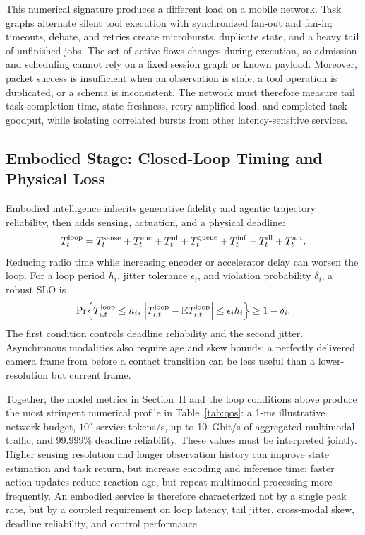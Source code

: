\documentclass[letterpaper,journal]{IEEEtran}
\begin{document}
This numerical signature produces a different load on a mobile network. Task
graphs alternate silent tool execution with synchronized fan-out and fan-in;
timeouts, debate, and retries create microbursts, duplicate state, and a heavy
tail of unfinished jobs. The set of active flows changes during execution, so
admission and scheduling cannot rely on a fixed session graph or known payload.
Moreover, packet success is insufficient when an observation is stale, a tool
operation is duplicated, or a schema is inconsistent. The network must
therefore measure tail task-completion time, state freshness, retry-amplified
load, and completed-task goodput, while isolating correlated bursts from other
latency-sensitive services.

\subsection{Embodied Stage: Closed-Loop Timing and Physical Loss}
Embodied intelligence inherits generative fidelity and agentic trajectory
reliability, then adds sensing, actuation, and a physical deadline:
\begin{equation}
T_t^{\rm loop}=T_t^{\rm sense}+T_t^{\rm enc}+T_t^{\rm ul}
+T_t^{\rm queue}+T_t^{\rm inf}+T_t^{\rm dl}+T_t^{\rm act}.
\label{eq:loop_delay}
\end{equation}
Reducing radio time while increasing encoder or accelerator delay can worsen
the loop. For a loop period $h_i$, jitter tolerance $\epsilon_i$, and violation
probability $\delta_i$, a robust SLO is
\begin{equation}
\Pr\!\left\{T_{i,t}^{\rm loop}\le h_i,\,
\left|T_{i,t}^{\rm loop}-\mathbb{E}T_{i,t}^{\rm loop}\right|
\le\epsilon_i h_i\right\}\ge 1-\delta_i.
\label{eq:robust_slo}
\end{equation}
The first condition controls deadline reliability and the second jitter.
Asynchronous modalities also require age and skew bounds: a perfectly delivered
camera frame from before a contact transition can be less useful than a lower-
resolution but current frame.

Together, the model metrics in Section~II and the loop conditions above produce
the most stringent numerical profile in Table~\ref{tab:qos}: a 1-ms
illustrative network budget, $10^5$ service tokens/s, up to 10~Gbit/s of
aggregated multimodal traffic, and 99.999\% deadline reliability. These values
must be interpreted jointly. Higher sensing resolution and longer observation
history can improve state estimation and task return, but increase encoding and
inference time; faster action updates reduce reaction age, but repeat
multimodal processing more frequently. An embodied service is therefore
characterized not by a single peak rate, but by a coupled requirement on loop
latency, tail jitter, cross-modal skew, deadline reliability, and control
performance.
\end{document}
